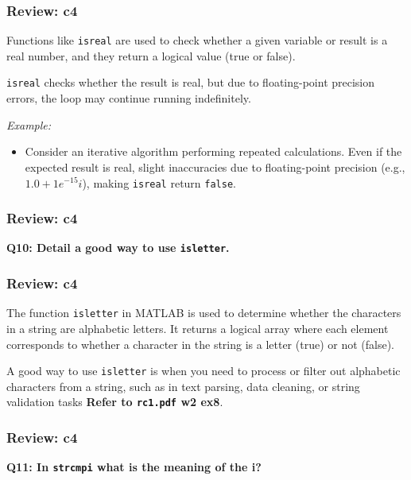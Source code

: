 \documentclass[
	11pt, %
]{beamer}
\begin{document}

\begin{frame}
	\frametitle{Review: c4}


Functions like \texttt{isreal} are used to check whether a given variable or result is a real number, and they return a logical value (true or false).

\texttt{isreal} checks whether the result is real, but due to floating-point precision errors, the loop may continue running indefinitely.

\textit{Example:}
\begin{itemize}
    \item Consider an iterative algorithm performing repeated calculations. Even if the expected result is real, slight inaccuracies due to floating-point precision (e.g., \texttt{$1.0 + 1e^{-15}i$}), making \texttt{isreal} return \texttt{false}.
\end{itemize}

\end{frame}


\begin{frame}
	\frametitle{Review: c4}

	\textbf{Q10: Detail a good way to use \texttt{isletter}.}

\end{frame}


\begin{frame}
	\frametitle{Review: c4}

The function \texttt{isletter} in MATLAB is used to determine whether the characters in a string are alphabetic letters. It returns a logical array where each element corresponds to whether a character in the string is a letter (true) or not (false). 

A good way to use \texttt{isletter} is when you need to process or filter out alphabetic characters from a string, such as in text parsing, data cleaning, or string validation tasks \textbf{Refer to \texttt{rc1.pdf} w2 ex8}.


\end{frame}



\begin{frame}
	\frametitle{Review: c4}

	\textbf{Q11: In \texttt{strcmpi} what is the meaning of the i?}

\end{frame}
\end{document}
